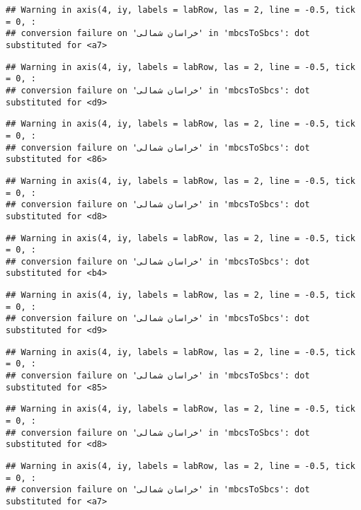 \documentclass[
]{article}
\begin{document}
\begin{verbatim}
## Warning in axis(4, iy, labels = labRow, las = 2, line = -0.5, tick = 0, :
## conversion failure on 'خراسان شمالی' in 'mbcsToSbcs': dot substituted for <a7>
\end{verbatim}

\begin{verbatim}
## Warning in axis(4, iy, labels = labRow, las = 2, line = -0.5, tick = 0, :
## conversion failure on 'خراسان شمالی' in 'mbcsToSbcs': dot substituted for <d9>
\end{verbatim}

\begin{verbatim}
## Warning in axis(4, iy, labels = labRow, las = 2, line = -0.5, tick = 0, :
## conversion failure on 'خراسان شمالی' in 'mbcsToSbcs': dot substituted for <86>
\end{verbatim}

\begin{verbatim}
## Warning in axis(4, iy, labels = labRow, las = 2, line = -0.5, tick = 0, :
## conversion failure on 'خراسان شمالی' in 'mbcsToSbcs': dot substituted for <d8>
\end{verbatim}

\begin{verbatim}
## Warning in axis(4, iy, labels = labRow, las = 2, line = -0.5, tick = 0, :
## conversion failure on 'خراسان شمالی' in 'mbcsToSbcs': dot substituted for <b4>
\end{verbatim}

\begin{verbatim}
## Warning in axis(4, iy, labels = labRow, las = 2, line = -0.5, tick = 0, :
## conversion failure on 'خراسان شمالی' in 'mbcsToSbcs': dot substituted for <d9>
\end{verbatim}

\begin{verbatim}
## Warning in axis(4, iy, labels = labRow, las = 2, line = -0.5, tick = 0, :
## conversion failure on 'خراسان شمالی' in 'mbcsToSbcs': dot substituted for <85>
\end{verbatim}

\begin{verbatim}
## Warning in axis(4, iy, labels = labRow, las = 2, line = -0.5, tick = 0, :
## conversion failure on 'خراسان شمالی' in 'mbcsToSbcs': dot substituted for <d8>
\end{verbatim}

\begin{verbatim}
## Warning in axis(4, iy, labels = labRow, las = 2, line = -0.5, tick = 0, :
## conversion failure on 'خراسان شمالی' in 'mbcsToSbcs': dot substituted for <a7>
\end{verbatim}
\end{document}
